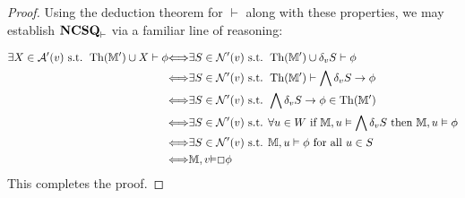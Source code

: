 \begin{proof}
  Using the deduction theorem for $\vdash$ along with these
  properties, we may establish  $\text{{\bfseries{NCSQ}}}_\vdash$ via a familiar line of reasoning:
  
  \begin{align*}
    \text{$\exists X \in \mathcal{A}'(v) \text{ s.t. } \operatorname{Th}
    (\mathbb{M}') \cup X \vdash \phi$} & {\Longleftrightarrow}\text{$\exists
    S \in \mathcal{N'}(v) \text{ s.t. } \operatorname{Th} (\mathbb{M}') \cup
    \delta_v S \vdash \phi$}\\
    & {\Longleftrightarrow}\text{$\exists S \in \mathcal{N}'(v) \text{ s.t. }
    \operatorname{Th} (\mathbb{M}') \vdash \bigwedge \delta_v S \rightarrow
    \phi$}\\
    & {\Longleftrightarrow}\text{$\exists S \in \mathcal{N}'(v) \text{ s.t. }
    \bigwedge \delta_v S \rightarrow \phi \in \operatorname{Th} (\mathbb{M}')$}\\
    & {\Longleftrightarrow}\text{$\exists S \in \mathcal{N}'(v) \text{ s.t.
    $\forall u \in W$ if } \mathbb{M}, u \vDash \bigwedge \delta_v S \text{
    then } \mathbb{M}, u \vDash \phi$}\\
    & {\Longleftrightarrow}\text{$\exists S \in \mathcal{N}'(v) \text{ s.t. }
    \mathbb{M}, u \vDash \phi \text{ for all } u \in S$}\\
    & {\Longleftrightarrow}{\mathbb{M}},v{\vDash}\Box{\phi}
  \end{align*}
  This completes the proof.
\end{proof}
